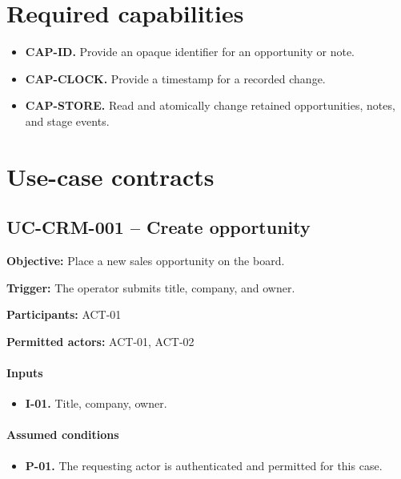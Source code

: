 \documentclass[10pt,a4paper]{article}
\begin{document}
\section{Required capabilities}

\begin{itemize}

\item \textbf{CAP-ID.} Provide an opaque identifier for an opportunity or note.

\item \textbf{CAP-CLOCK.} Provide a timestamp for a recorded change.

\item \textbf{CAP-STORE.} Read and atomically change retained opportunities, notes, and stage events.

\end{itemize}

\section{Use-case contracts}

\subsection{UC-CRM-001 -- Create opportunity}

\textbf{Objective:} Place a new sales opportunity on the board.

\textbf{Trigger:} The operator submits title, company, and owner.

\textbf{Participants:} ACT-01

\textbf{Permitted actors:} ACT-01, ACT-02

\paragraph{Inputs}

\begin{itemize}

\item \textbf{I-01.} Title, company, owner.

\end{itemize}

\paragraph{Assumed conditions}

\begin{itemize}

\item \textbf{P-01.} The requesting actor is authenticated and permitted for this case.

\end{itemize}
\end{document}
